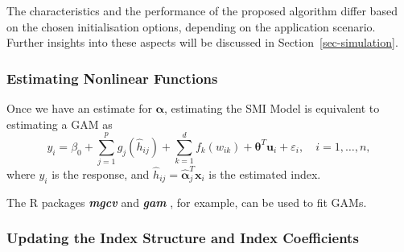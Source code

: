 \documentclass[11pt,a4paper,]{article}
\begin{document}
The characteristics and the performance of the proposed algorithm differ
based on the chosen initialisation options, depending on the application
scenario. Further insights into these aspects will be discussed in
Section~\ref{sec-simulation}.

\hypertarget{sec-step2}{%
\subsubsection{Estimating Nonlinear Functions}\label{sec-step2}}

Once we have an estimate for \(\bm{\alpha}\), estimating the SMI Model
is equivalent to estimating a GAM as \[
  y_{i} = \beta_{0} + \sum_{j = 1}^{p}g_{j}(\hat{h}_{ij}) + \sum_{k = 1}^{d}f_{k}(w_{ik}) + \bm{\theta}^{T}\bm{u}_{i} + \varepsilon_{i}, \quad i = 1, \dots, n,
\] where \(y_{i}\) is the response, and
\(\hat{h}_{ij} = \hat{\bm{\alpha}}_{j}^{T}\bm{x}_{i}\) is the estimated
index.

The R packages \textbf{\emph{mgcv}} \autocite{Wood2011} and
\textbf{\emph{gam}} \autocite{Hastie2023}, for example, can be used to
fit GAMs.

\hypertarget{sec-step3}{%
\subsubsection{Updating the Index Structure and Index
Coefficients}\label{sec-step3}}
\end{document}
